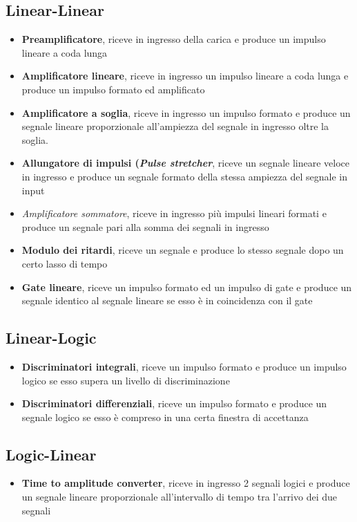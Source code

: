 \subsection{Linear-Linear}
\begin{itemize}
\item \textbf{Preamplificatore}, riceve in ingresso della carica e produce un impulso lineare a coda lunga 
\item \textbf{Amplificatore lineare}, riceve in ingresso un impulso lineare a coda lunga e produce un impulso formato ed amplificato
\item \textbf{Amplificatore a soglia}, riceve in ingresso un impulso formato e produce un segnale lineare proporzionale all'ampiezza del segnale in ingresso oltre la soglia.
\item \textbf{Allungatore di impulsi (\textit{Pulse stretcher}}, riceve un segnale lineare veloce in ingresso e produce un segnale formato della stessa ampiezza del segnale in input
\item \textit{Amplificatore sommatore}, riceve in ingresso pi\`u impulsi lineari formati e produce un segnale pari alla somma dei segnali in ingresso
\item \textbf{Modulo dei ritardi}, riceve un segnale e produce lo stesso segnale dopo un certo lasso di tempo
\item \textbf{Gate lineare}, riceve un impulso formato ed un impulso di gate e produce un segnale identico al segnale lineare se esso \`e in coincidenza con il gate
\end{itemize}
\subsection{Linear-Logic}
\begin{itemize}
\item \textbf{Discriminatori integrali}, riceve un impulso formato e produce un impulso logico se esso supera un livello di discriminazione
\item \textbf{Discriminatori differenziali}, riceve un impulso formato e produce un segnale logico se esso \`e compreso in una certa finestra di accettanza
\end{itemize}
\subsection{Logic-Linear}
\begin{itemize}
\item \textbf{Time to amplitude converter}, riceve in ingresso 2 segnali logici e produce un segnale lineare proporzionale all'intervallo di tempo tra l'arrivo dei due segnali
\end{itemize}
